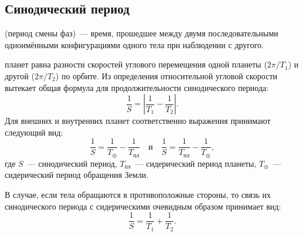 \subsection{Синодический период}

 (период смены фаз)~--- время, прошедшее между двумя последовательными одноимёнными конфигурациями одного тела при наблюдении с другого.

 планет равна
разности скоростей углового перемещения одной планеты ($2\pi/T_1$) и другой ($2\pi/T_2 $) по орбите. Из определения относительной угловой скорости вытекает общая формула для продолжительности синодического периода:
\begin{equation}
	\frac1S=\left| \frac{1}{T_1}-\frac{1}{T_2} \right|.
\end{equation}
Для внешних и внутренних планет соответственно выражения принимают следующий вид:
\begin{equation} \frac{1}{S} = \frac{1}{T_\oplus} - \frac{1}{T_\text{пл}} \quad \text{и} \quad \frac{1}{S} = \frac{1}{T_\text{пл}} - \frac{1}{T_\oplus},
\end{equation}
где $S$~--- синодический период, $T_\text{пл}$~--- сидерический период планеты, $T_\oplus$~--- сидерический период обращения Земли.

В случае, если тела обращаются в противоположные стороны, то связь
их синодического периода с сидерическими очевидным образом принимает вид:
\begin{equation}
	\frac{1}{S} = \frac{1}{T_1} + \frac{1}{T_2}.
\end{equation}
